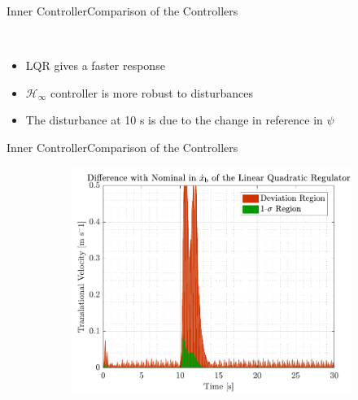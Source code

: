 \begin{frame}{Inner Controller}{Comparison of the Controllers}
\begin{figure}[H]
\begin{minipage}{0.45\linewidth}
\begin{figure}[H]
    \end{figure}                
  \end{minipage}\hfill \\
\end{figure}
\begin{itemize}
    \item LQR gives a faster response
    \item $\mathcal{H}_\infty$ controller is more robust to disturbances
    \item The disturbance at 10 s is due to the change in reference in $\psi$
\end{itemize}
\end{frame}


\begin{frame}{Inner Controller}{Comparison of the Controllers}
  \begin{figure}[H]
    \begin{minipage}{0.45\linewidth}
      \begin{figure}[H]
        \centering
        \includegraphics[width=1\linewidth]{figures/xbdot_mc_lqr_error}
      \end{figure}        
    \end{minipage}\hfill      
    \begin{minipage}{0.45\linewidth}
      \begin{figure}[H]
        \centering

\end{figure}
\end{minipage}
\end{figure}
\end{frame}
